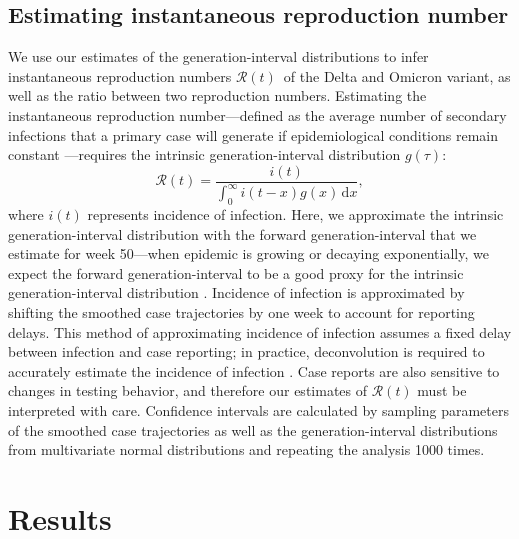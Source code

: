 \documentclass[12pt]{article}
\newcommand{\comment}{\showcomment}
\newcommand{\showcomment}[3]{\textcolor{#1}{\textbf{[#2: }\textsl{#3}\textbf{]}}}
\newcommand{\jd}[1]{\comment{cyan}{JD}{#1}}
\newcommand{\swp}[1]{\comment{magenta}{SWP}{#1}}
\newcommand{\Rt}{\ensuremath{{\mathcal R}(t)}\xspace}
\newcommand{\dd}[1]{\ensuremath{\, \mathrm{d}#1}}
\newcommand{\dx}{\dd{x}}
\begin{document}
\subsection{Estimating instantaneous reproduction number}

We use our estimates of the generation-interval distributions to infer instantaneous reproduction numbers \Rt\ of the Delta and Omicron variant, as well as the ratio between two reproduction numbers.
Estimating the instantaneous reproduction number---defined as the average number of secondary infections that a primary case will generate if epidemiological conditions remain constant \citep{fraser2007estimating}---requires the intrinsic generation-interval distribution $g(\tau)$:
\begin{equation}
\Rt = \frac{i(t)}{\int_0^\infty i(t-x) g(x) \dx},
\end{equation}
where $i(t)$ represents incidence of infection.
Here, we approximate the intrinsic generation-interval distribution with the forward generation-interval that we estimate for week 50---when epidemic is growing or decaying exponentially, we expect the forward generation-interval to be a good proxy for the intrinsic generation-interval distribution \citep{champredon2015intrinsic, park2020inferring}.
Incidence of infection is approximated by shifting the smoothed case trajectories by one week to account for reporting delays.
This method of approximating incidence of infection assumes a fixed delay between infection and case reporting;
in practice, deconvolution is required to accurately estimate the incidence of infection \citep{goldstein2009reconstructing}.
Case reports are also sensitive to changes in testing behavior, and therefore our estimates of $\Rt$ must be interpreted with care.
Confidence intervals are calculated by sampling parameters of the smoothed case trajectories as well as the generation-interval distributions from multivariate normal distributions and repeating the analysis 1000 times.

\section{Results}
\end{document}

